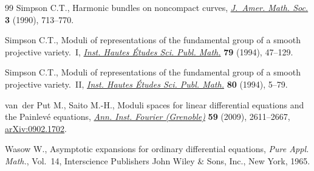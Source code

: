 \documentclass[pdftex]{sigma}
\numberwithin{equation}{section}
\begin{document}
\begin{thebibliography}{99}
Simpson C.T., Harmonic bundles on noncompact curves, \href{https://doi.org/10.2307/1990935}{\textit{J.~Amer. Math.
 Soc.}} \textbf{3} (1990), 713--770.

Simpson C.T., Moduli of representations of the fundamental group of a smooth
 projective variety.~{I}, \href{https://doi.org/10.1007/BF02698887}{\textit{Inst. Hautes \'Etudes Sci. Publ. Math.}}
 \textbf{79} (1994), 47--129.

Simpson C.T., Moduli of representations of the fundamental group of a smooth
 projective variety.~{II}, \href{https://doi.org/10.1007/BF02698895}{\textit{Inst. Hautes \'Etudes Sci. Publ. Math.}}
 \textbf{80} (1994), 5--79.

van~der Put M., Saito M.-H., Moduli spaces for linear differential equations and
 the {P}ainlev\'e equations, \href{https://doi.org/10.5802/aif.2502}{\textit{Ann. Inst. Fourier (Grenoble)}}
 \textbf{59} (2009), 2611--2667, \href{https://arxiv.org/abs/0902.1702}{arXiv:0902.1702}.

Wasow W., Asymptotic expansions for ordinary differential equations,
 \textit{Pure Appl. Math.}, Vol.~14, Interscience Publishers John
 Wiley \& Sons, Inc., New York, 1965.

\end{thebibliography}\LastPageEnding
\end{document}
